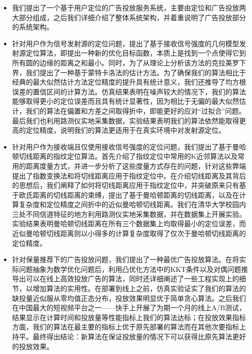 \begin{itemize}
	
	\item 我们提出了一个基于用户定位的广告投放服务系统，主要由定位和广告投放两大部分组成，之后我们详细介绍了整体系统架构，并着重说明了广告投放部分的系统架构。
	
	\item 针对用户作为信号发射源的定位问题，提出了基于接收信号强度的几何模型发射源定位算法，即提出一种新的优化目标函数，本质上是找到一个点使得它到所有圆的边缘的距离之和最小。同时，为了从理论上分析该方法的克拉美罗下界，我们提出了一种基于蒙特卡洛法的估计方法。为了确保我们的算法相比于经典的最大似然估计方法定位精度的提升具有统计意义，我们还推导了均方根误差的置信区间的计算方法。仿真结果表明在噪声较大的情况下，我们的算法能够取得更小的定位误差而且具有统计显著性，因为相比于无偏的最大似然估计，我们的算法在偏置和方差之间取得折中，即能更好的应对“过拟合”问题。最后我们也利用路测仪实地采集数据，实验结果表明我们的算法依然能取得更高的定位精度，说明我们的算法更适用于在真实环境中对发射源定位。
	
	\item 针对用户作为接收端且仅使用接收信号强度的定位问题，我们提出了基于曼哈顿切线距离的指纹定位算法。首先介绍了指纹定位中常用的K近邻算法以及常用的距离度量方式，并进一步分析了这些度量方式存在的问题，针对这些弊端提出了指数变换法和将切线距离应用于指纹定位中。在介绍切线距离及其背后的思想后，我们阐释了如何将切线距离应用于指纹定位中，并突破原来只有基于欧氏距离的切线距离的束缚，提出了基于曼哈顿距离的切线距离，以及在计算复杂度和定位精度之间折中的近似曼哈顿切线距离。我们在清华大学校园内三处不同信道特征的地方利用路测仪实地采集数据，并在数据集上开展实验。实验结果表明曼哈顿切线距离在所有三个数据集上均取得最小的定位误差，而近似曼哈顿切线距离则以小得多的计算复杂度取得了仅次于曼哈顿切线距离的定位精度。
	
	\item 针对保量推荐下的广告投放问题，我们提出了一种最优广告投放算法。在将实际问题抽象为数学优化问题后，利用凸优化方法中的KKT条件以及对偶问题推导出可以在线上高效投放广告的算法，同时还详细阐述了一些工程实现上的细节，以增加算法的实用性。在部署到线上之前，仿真实验证实了我们的算法的缺投量近似服从零均值正态分布，投放效果明显优于简单贪心算法。之后我们在中国最大的短视频平台之一——快手上开展了为期一个月的线上A/B测试，结果显示在计算时间和投放量等性能指标上我们的算法达标；在投放效果指标方面，我们的算法在最主要的指标上优于原先部署的算法而在其他次要指标上持平。最终得出结论：新算法在保证投放量的情况下可以获得比原先算法更好的投放效果。
\end{itemize}

